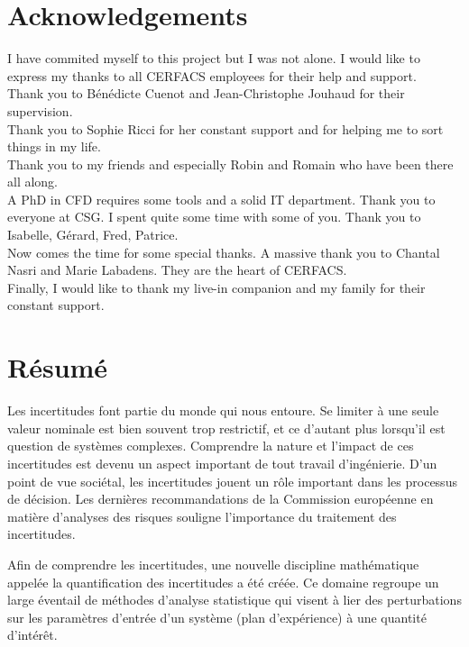 
\cleardoublepage
\chapter*{Acknowledgements}

I have commited myself to this project but I was not alone. I would like to express my thanks to all CERFACS employees for their help and support.\\

Thank you to Bénédicte Cuenot and Jean-Christophe Jouhaud for their supervision.\\

Thank you to Sophie Ricci for her constant support and for helping me to sort things in my life.\\

Thank you to my friends and especially Robin and Romain who have been there all along.\\

A PhD in CFD requires some tools and a solid IT department. Thank you to everyone at CSG. I spent quite some time with some of you. Thank you to Isabelle, Gérard, Fred, Patrice.\\

Now comes the time for some special thanks. A massive thank you to Chantal Nasri and Marie Labadens. They are the heart of CERFACS.\\[1cm]

Finally, I would like to thank my live-in companion and my family for their constant support.

\newpage
{}
\chapter*{Résumé}

Les incertitudes font partie du monde qui nous entoure. Se limiter à une seule valeur nominale est bien souvent trop restrictif, et ce d'autant plus lorsqu'il est question de systèmes complexes. Comprendre la nature et l'impact de ces incertitudes est devenu un aspect important de tout travail d'ingénierie. D'un point de vue sociétal, les incertitudes jouent un rôle important dans les processus de décision. Les dernières recommandations de la Commission européenne en matière d'analyses des risques souligne l'importance du traitement des incertitudes.

Afin de comprendre les incertitudes, une nouvelle discipline mathématique appelée la quantification des incertitudes a été créée. Ce domaine regroupe un large éventail de méthodes d'analyse statistique qui visent à lier des perturbations sur les paramètres d'entrée d'un système (plan d'expérience) à une quantité d'intérêt.


